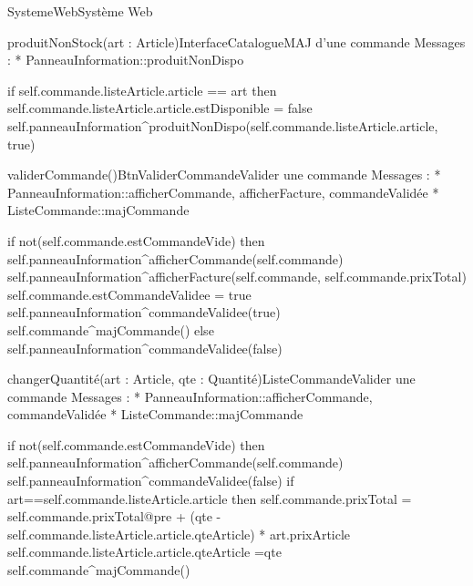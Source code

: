 \begin{OM}{SystemeWeb}{Système Web}
\begin{OMOperation}{produitNonStock(art : Article)}{InterfaceCatalogue}{MAJ d'une commande}
Messages :
* PanneauInformation::{produitNonDispo}
\begin{OMPre}
\end{OMPre}
\begin{OMPost}
        if self.commande.listeArticle.article == art then
                self.commande.listeArticle.article.estDisponible = false
                self.panneauInformation^produitNonDispo(self.commande.listeArticle.article, true)
            \end{OMPost}
\end{OMOperation}

\begin{OMOperation}{validerCommande()}{BtnValiderCommande}{Valider une commande}
Messages :
* PanneauInformation::{afficherCommande, afficherFacture, commandeValidée}
* ListeCommande::{majCommande}
\begin{OMPre}
\end{OMPre}
\begin{OMPost}
if not(self.commande.estCommandeVide) then
        self.panneauInformation^afficherCommande(self.commande)
self.panneauInformation^afficherFacture(self.commande,
self.commande.prixTotal)
                self.commande.estCommandeValidee = true
                self.panneauInformation^commandeValidee(true)
                self.commande^majCommande()
        else
                self.panneauInformation^commandeValidee(false)
            \end{OMPost}
\end{OMOperation}

\begin{OMOperation}{changerQuantité(art : Article, qte : Quantité)}{ListeCommande}{Valider une commande}
Messages :
* PanneauInformation::{afficherCommande, commandeValidée}
* ListeCommande::{majCommande}
\begin{OMPre}
\end{OMPre}
\begin{OMPost}
if not(self.commande.estCommandeVide) then
                self.panneauInformation^afficherCommande(self.commande)
                self.panneauInformation^commandeValidee(false)
                if art==self.commande.listeArticle.article then
                        self.commande.prixTotal = self.commande.prixTotal@pre + (qte -
self.commande.listeArticle.article.qteArticle) * art.prixArticle
                        self.commande.listeArticle.article.qteArticle =qte
                self.commande^majCommande()
            \end{OMPost}
\end{OMOperation}


\end{OM}
